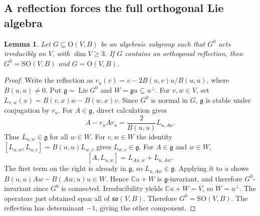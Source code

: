 \documentclass[11pt,a4paper]{article}
\newtheorem{lemma}[theorem]{Lemma}
\theoremstyle{definition}
\theoremstyle{remark}
\numberwithin{equation}{section}
\begin{document}
\subsection{A reflection forces the full orthogonal Lie algebra}

\begin{lemma}\label{p7:gn:reflection-lie}
Let $G\subseteq\mathrm O(V,B)$ be an algebraic subgroup such that
$G^0$ acts irreducibly on $V$, with $\dim V\ge3$. If $G$ contains
an orthogonal reflection, then $G^0=\mathrm{SO}(V,B)$ and
$G=\mathrm O(V,B)$.
\end{lemma}
\begin{proof}
Write the reflection as
$r_u(v)=v-2B(u,v)u/B(u,u)$, where $B(u,u)\ne0$.
Put $\mathfrak g=\operatorname{Lie}G^0$ and
$W=\mathfrak g u\subseteq u^\perp$. For $v,w\in V$, set
$L_{v,w}(x)=B(v,x)w-B(w,x)v$. Since $G^0$ is normal in $G$,
$\mathfrak g$ is stable under conjugation by $r_u$. For
$A\in\mathfrak g$, direct calculation gives
\[
 A-r_uAr_u=\frac{2}{B(u,u)}L_{u,Au}.
\]
Thus $L_{u,w}\in\mathfrak g$ for all $w\in W$.
For $v,w\in W$ the identity
$[L_{u,w},L_{u,v}]=B(u,u)L_{w,v}$ gives
$L_{w,v}\in\mathfrak g$.
For $A\in\mathfrak g$ and $w\in W$,
\[
 [A,L_{u,w}]=L_{Au,w}+L_{u,Aw}.
\]
The first term on the right is already in $\mathfrak g$, so
$L_{u,Aw}\in\mathfrak g$. Applying it to $u$ shows
$B(u,u)Aw-B(Aw,u)u\in W$. Hence $\mathbb Cu+W$ is
$\mathfrak g$-invariant, and therefore $G^0$-invariant since
$G^0$ is connected. Irreducibility yields $\mathbb Cu+W=V$,
so $W=u^\perp$. The operators just obtained span all of
$\mathfrak{so}(V,B)$. Therefore $G^0=\mathrm{SO}(V,B)$.
The reflection has determinant $-1$, giving the other component.
\end{proof}
\end{document}
